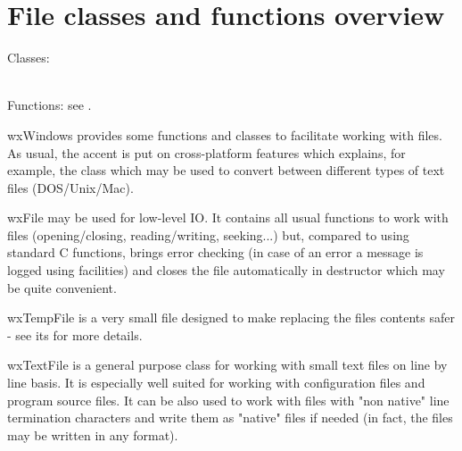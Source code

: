 \section{File classes and functions overview}\label{wxfileoverview}

Classes: \\
\\

Functions: see .

wxWindows provides some functions and classes to facilitate working with files.
As usual, the accent is put on cross-platform features which explains, for
example, the  class which may be used to convert
between different types of text files (DOS/Unix/Mac).

wxFile may be used for low-level IO. It contains all usual functions to work
with files (opening/closing, reading/writing, seeking...) but, compared to
using standard C functions, brings error checking (in case of an error a message
is logged using  facilities) and closes the file
automatically in destructor which may be quite convenient.

wxTempFile is a very small file designed to make replacing the files contents
safer - see its  for more details.

wxTextFile is a general purpose class for working with small text files on line
by line basis. It is especially well suited for working with configuration files
and program source files. It can be also used to work with files with "non
native" line termination characters and write them as "native" files if needed
(in fact, the files may be written in any format).
